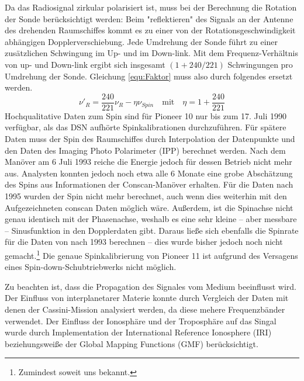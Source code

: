 Da das Radiosignal zirkular polarisiert ist, muss bei der Berechnung die Rotation der Sonde berücksichtigt werden: Beim "reflektieren" des Signals an der Antenne des drehenden Raumschiffes kommt es zu einer von der Rotationsgeschwindigkeit abhängigen Dopplerverschiebung. Jede Umdrehung der Sonde führt zu einer zusätzlichen Schwingung im Up- und im Down-link. Mit dem Frequenz-Verhältnis von up- und Down-link ergibt sich insgesamt $(1+240/221)$ Schwingungen pro Umdrehung der Sonde.\cite{Anderson2002} %
Gleichung \ref{equ:Faktor} muss also durch folgendes ersetzt werden.
\begin{equation}
\nu'_R = \frac{240}{221}\nu_R - \eta\nu_{Spin} \quad \mathrm{mit}  \quad \eta = 1+ \frac{240}{221}
\end{equation}
Hochqualitative Daten zum Spin sind für Pioneer 10 nur bis zum 17. Juli 1990 verfügbar, als das DSN aufhörte Spinkalibrationen durchzuführen. Für spätere Daten muss der Spin des Raumschiffes durch Interpolation der Datenpunkte und den Daten des Imaging Photo Polarimeter (IPP) berechnet werden. Nach dem Manöver am 6 Juli 1993 reiche die Energie jedoch für dessen Betrieb nicht mehr aus. Analysten konnten jedoch noch etwa alle 6 Monate eine grobe Abschätzung des Spins aus Informationen der Conscan-Manöver erhalten. %
Für die Daten nach 1995 wurden der Spin nicht mehr berechnet, auch wenn dies weiterhin mit den Aufgezeichneten conscan Daten möglich wäre. Außerdem, ist die Spinachse nicht genau identisch mit der Phasenachse, weshalb es eine sehr kleine – aber messbare – Sinusfunktion in den Dopplerdaten gibt. Daraus ließe sich ebenfalls die Spinrate für die Daten von nach 1993 berechnen – dies wurde bisher jedoch noch nicht gemacht.\footnote{Zumindest soweit uns bekannt.}
Die genaue Spinkalibrierung von Pioneer 11 ist aufgrund des Versagens eines Spin-down-Schubtriebwerks nicht möglich.\cite{Anderson2002}

Zu beachten ist, dass die Propagation des Signales vom Medium beeinflusst wird. Der Einfluss von interplanetarer Materie konnte durch Vergleich
der Daten mit denen der Cassini-Mission analysiert werden, da diese mehere Frequenzbänder verwendet.\cite{Dittus2006} %
Der Einfluss der Ionosphäre und der Troposphäre auf das Singal wurde durch Implementation der International Reference Ionosphere (IRI)
beziehungsweiße der Global Mapping Functions (GMF) berücksichtigt.\cite{Levy2008} %

